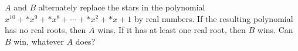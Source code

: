 $A$ and $B$ alternately replace the stars in the polynomial $x^{10} + {*}x^9 + {*}x^8 + \cdots + {*}x^2 + {*}x + 1$ by real numbers. If the resulting polynomial has no real roots, then $A$ wins. If it has at least one real root, then $B$ wins. Can $B$ win, whatever $A$ does?
